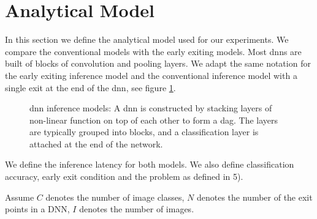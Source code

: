 \newpage\section{Analytical Model} \label{sec:ee-metrics}

In this section we define the analytical model used for our experiments. We compare the conventional models with the early exiting models. Most \gls{dnn}s are built of blocks of convolution and pooling layers. We adapt the same notation for the early exiting inference model and the conventional inference model with a single exit at the end of the \gls{dnn}, see figure \ref{fig:inference_models}.
	\begin{figure}
		\centering
		\captionsetup[subfigure]{justification=centering, farskip=1pt,captionskip=1pt}
		\hfill
		\caption[\gls{dnn} structure]{\gls{dnn} inference models: A \gls{dnn} is constructed by stacking layers of non-linear function on top of each other to form a \gls{dag}. The layers are typically grouped into blocks, and a classification layer is attached at the end of the network.}
		\label{fig:inference_models}
	\end{figure}	
	We define the inference latency for both models. We also define classification accuracy, early exit condition and the problem as defined in 5). 
	
	Assume $ C $ denotes the number of image classes, $ N $ denotes the number of the exit points in a DNN, $ I $ denotes the number of images.

